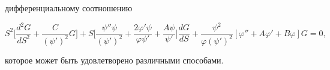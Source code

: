 дифференциальному соотношению 


\begin{equation} 


S^2\biggl[\frac{d^2G}{dS^2}+\frac{C}{(\psi')^2}G\biggr]+ 


S\biggl[\frac{\psi''\psi}{(\psi')^2}+ 


\frac{2\varphi'\psi}{\varphi\psi'}+\frac{A\psi}{\psi'}\biggr] 


\frac{dG}{dS}+\frac{\psi^2}{\varphi(\psi')^2} 


[\varphi''+A\varphi'+B\varphi]G=0, 


\end{equation} 


которое может быть удовлетворено различными способами. 


 


